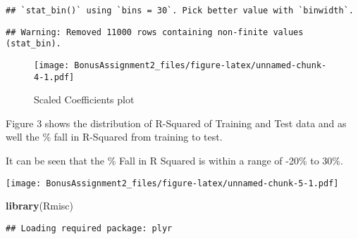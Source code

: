 \documentclass[]{article}
\newenvironment{Shaded}{\begin{snugshade}}{\end{snugshade}}
\newcommand{\KeywordTok}[1]{\textcolor[rgb]{0.13,0.29,0.53}{\textbf{#1}}}
\newcommand{\DataTypeTok}[1]{\textcolor[rgb]{0.13,0.29,0.53}{#1}}
\newcommand{\DecValTok}[1]{\textcolor[rgb]{0.00,0.00,0.81}{#1}}
\newcommand{\StringTok}[1]{\textcolor[rgb]{0.31,0.60,0.02}{#1}}
\newcommand{\OperatorTok}[1]{\textcolor[rgb]{0.81,0.36,0.00}{\textbf{#1}}}
\newcommand{\NormalTok}[1]{#1}
\begin{document}
\begin{verbatim}
## `stat_bin()` using `bins = 30`. Pick better value with `binwidth`.
\end{verbatim}

\begin{verbatim}
## Warning: Removed 11000 rows containing non-finite values (stat_bin).
\end{verbatim}

\begin{figure}
\centering
\texttt{[image: BonusAssignment2\_files/figure-latex/unnamed-chunk-4-1.pdf]}
\caption{Scaled Coefficients plot}
\end{figure}

Figure 3 shows the distribution of R-Squared of Training and Test data
and as well the \% fall in R-Squared from training to test.

It can be seen that the \% Fall in R Squared is within a range of -20\%
to 30\%.

\begin{Shaded}
\end{Shaded}

\texttt{[image: BonusAssignment2\_files/figure-latex/unnamed-chunk-5-1.pdf]}

\begin{Shaded}
\begin{Highlighting}[]
\KeywordTok{library}\NormalTok{(Rmisc)}
\end{Highlighting}
\end{Shaded}

\begin{verbatim}
## Loading required package: plyr
\end{verbatim}
\end{document}
